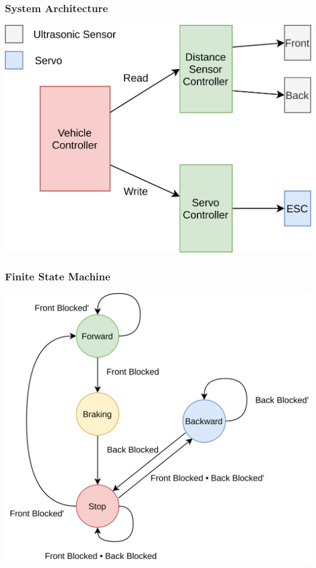 \documentclass{beamer}
\begin{document}
\begin{frame}
    \frametitle{System Architecture}
    \centering
    \includegraphics[scale=0.065]{img/system-architecture.png}
\end{frame}

\begin{frame}
    \frametitle{Finite State Machine}
    \centering
    \includegraphics[scale=0.06, keepaspectratio]{img/finite-state-machine.png}
\end{frame}
\end{document}

